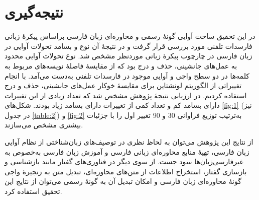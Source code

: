 \documentclass[12pt,onecolumn,a4paper]{article}
\begin{document}
    \section{نتیجه‌گیری}
    در این تحقیق  ساخت آوایی گونهٔ رسمی و محاوره‌ای زبان فارسی براساس پیکرهٔ زبانی فارسدات تلفنی مورد بررسی قرار گرفت و در نتیجهٔ آن نوع و بسامد تحولات آوایی در زبان فارسی در چارچوب پیکرهٔ زبانی موردنظر مشخص شد. نوع تحولات آوایی محدود به عمل‌های جانشینی، حذف و درج بود که از مقایسهٔ فاصلهٔ نویسه‌های مربوط به کلمه‌ها در دو سطح واجی و آوایی موجود در فارسدات تلفنی به‌دست می‌آمد. با انجام تغییراتی از الگوریتم لونشتاین برای مقایسهٔ خوکار عمل‌های جانشینی، حذف و درج استفاده کردیم. در ارزیابی نتیجهٔ پژوهش مشخص شد که تعداد زیادی از این تغییرات دارای بسامد کم و تعداد کمی از تغییرات دارای بسامد زیاد بودند. شکل‌های \ref{fig:1} (نیز در جدول \ref{table:2}) و \ref{fig:2} به‌ترتیب توزیع فراوانی 30  و 90 تغییر اول را با جزئیات بیشتری مشخص می‌سازند.
    \par
    از نتایج این پژوهش می‌توان به لحاظ نظری در توصیف‌های زبان‌شناختی از نظام آوایی زبان فارسی، تهیهٔ منابع محاوره‌ای زبانی فارسی و آموزش زبان فارسی به‌خصوص به غیرفارسی‌زبان‌ها سود جست. از سوی دیگر  در فناوری‌های گفتار مانند بازشناسی و بازسازی گفتار، استخراج اطلاعات از متن‌های محاوره‌ای، تبدیل متن به زنجیرهٔ واجی گونهٔ محاوره‌ای زبان فارسی و امکان تبدیل آن به گونهٔ رسمی می‌توان از نتایج این تحقیق استفاده کرد.

    {\mfo
    
    }
\end{document}
